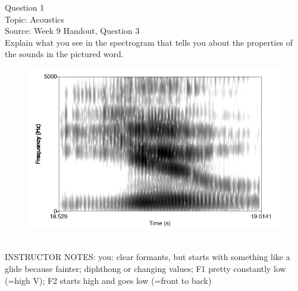 \documentclass[12pt]{article}
\begin{document}
\begin{center}
\textbf{{\color{violet}{\HUGE 20201116 Monday\\}}}

\textbf{{\color{violet}{\HUGE ALL EXAMS (with notes)\\}}}

\end{center}
\newpage

\begin{center}
\textbf{{\color{blue}{\HUGE START OF EXAM\\}}}

\textbf{{\color{blue}{\HUGE Student ID: 11661\\}}}

\textbf{{\color{blue}{\HUGE 4:00\\}}}

\end{center}
\newpage

{\large Question 1}\\

Topic: Acoustics\\
Source: Week 9 Handout, Question 3\\

Explain what you see in the spectrogram that tells you about the properties of the sounds in the pictured word.\\

\begin{figure}[H]
\includegraphics{../images/spectrogram_you.png}
\end{figure}

~\\
INSTRUCTOR NOTES: you: clear formants, but starts with something like a glide because fainter; diphthong or changing values; F1 pretty constantly low (=high V); F2 starts high and goes low (=front to back)
\end{document}

